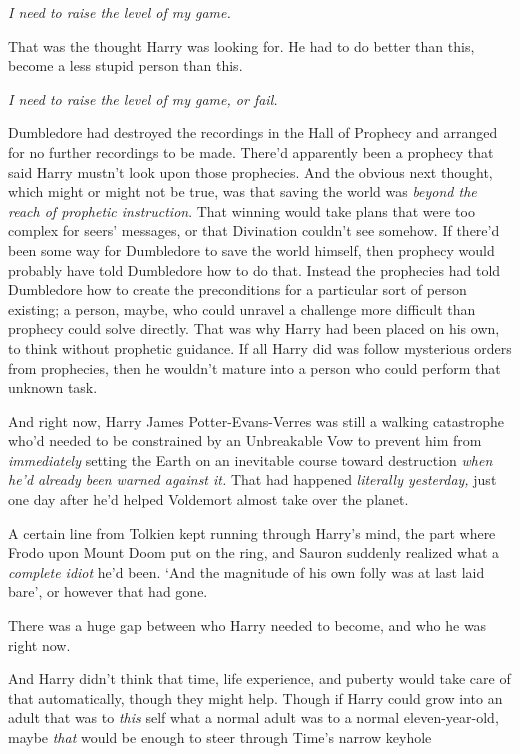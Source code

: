 \emph{I need to raise the level of my game.}

That was the thought Harry was looking for. He had to do better than this,
become a less stupid person than this.

\emph{I need to raise the level of my game, or fail.}

Dumbledore had destroyed the recordings in the Hall of Prophecy and arranged
for no further recordings to be made. There'd apparently been a prophecy that
said Harry mustn't look upon those prophecies. And the obvious next thought,
which might or might not be true, was that saving the world was \emph{beyond
the reach of prophetic instruction}. That winning would take plans that were
too complex for seers' messages, or that Divination couldn't see somehow. If
there'd been some way for Dumbledore to save the world himself, then prophecy
would probably have told Dumbledore how to do that. Instead the prophecies had
told Dumbledore how to create the preconditions for a particular sort of person
existing; a person, maybe, who could unravel a challenge more difficult than
prophecy could solve directly. That was why Harry had been placed on his own,
to think without prophetic guidance. If all Harry did was follow mysterious
orders from prophecies, then he wouldn't mature into a person who could perform
that unknown task.

And right now, Harry James Potter-Evans-Verres was still a walking catastrophe
who'd needed to be constrained by an Unbreakable Vow to prevent him from
\emph{immediately} setting the Earth on an inevitable course toward destruction
\emph{when he'd already been warned against it.} That had happened
\emph{literally yesterday,} just one day after he'd helped Voldemort almost
take over the planet.

A certain line from Tolkien kept running through Harry's mind, the part where
Frodo upon Mount Doom put on the ring, and Sauron suddenly realized what a
\emph{complete idiot} he'd been. `And the magnitude of his own folly was at
last laid bare', or however that had gone.

There was a huge gap between who Harry needed to become, and who he was right
now.

And Harry didn't think that time, life experience, and puberty would take care
of that automatically, though they might help. Though if Harry could grow into
an adult that was to \emph{this} self what a normal adult was to a normal
eleven-year-old, maybe \emph{that} would be enough to steer through Time's
narrow keyhole{\el}

